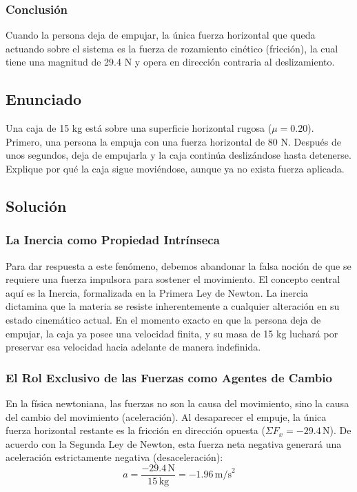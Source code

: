 \documentclass[12pt]{article}
\begin{document}
\subsubsection*{Conclusión}
Cuando la persona deja de empujar, la única fuerza horizontal que queda actuando sobre el sistema es la fuerza de rozamiento cinético (fricción), la cual tiene una magnitud de 29.4 N y opera en dirección contraria al deslizamiento.

\newpage

\subsection*{Enunciado}
Una caja de 15 kg está sobre una superficie horizontal rugosa ($\mu = 0.20$). Primero, una persona la empuja con una fuerza horizontal de 80 N. Después de unos segundos, deja de empujarla y la caja continúa deslizándose hasta detenerse. Explique por qué la caja sigue moviéndose, aunque ya no exista fuerza aplicada.

\subsection*{Solución}

\subsubsection*{La Inercia como Propiedad Intrínseca}
Para dar respuesta a este fenómeno, debemos abandonar la falsa noción de que se requiere una fuerza impulsora para sostener el movimiento. El concepto central aquí es la Inercia, formalizada en la Primera Ley de Newton. La inercia dictamina que la materia se resiste inherentemente a cualquier alteración en su estado cinemático actual. En el momento exacto en que la persona deja de empujar, la caja ya posee una velocidad finita, y su masa de 15 kg luchará por preservar esa velocidad hacia adelante de manera indefinida.

\subsubsection*{El Rol Exclusivo de las Fuerzas como Agentes de Cambio}
En la física newtoniana, las fuerzas no son la causa del movimiento, sino la causa del cambio del movimiento (aceleración). Al desaparecer el empuje, la única fuerza horizontal restante es la fricción en dirección opuesta ($\Sigma F_x = -29.4 \, \text{N}$). De acuerdo con la Segunda Ley de Newton, esta fuerza neta negativa generará una aceleración estrictamente negativa (desaceleración):
\begin{equation}
    a = \frac{-29.4 \, \text{N}}{15 \, \text{kg}} = -1.96 \, \text{m/s}^2
\end{equation}
\end{document}
